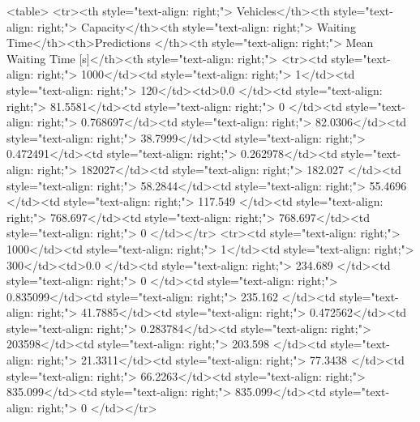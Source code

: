 <table>
<tr><th style="text-align: right;">  Vehicles</th><th style="text-align: right;">  Capacity</th><th style="text-align: right;">  Waiting Time</th><th>Predictions  </th><th style="text-align: right;">  Mean Waiting Time [s]</th><th style="text-align: right;">  %
<tr><td style="text-align: right;">      1000</td><td style="text-align: right;">         1</td><td style="text-align: right;">           120</td><td>0.0          </td><td style="text-align: right;">                81.5581</td><td style="text-align: right;">           0       </td><td style="text-align: right;">         0.768697</td><td style="text-align: right;">         82.0306</td><td style="text-align: right;">            38.7999</td><td style="text-align: right;">               0.472491</td><td style="text-align: right;">             0.262978</td><td style="text-align: right;">              182027</td><td style="text-align: right;">                      182.027 </td><td style="text-align: right;">            58.2844</td><td style="text-align: right;">                55.4696 </td><td style="text-align: right;">       117.549 </td><td style="text-align: right;">    768.697</td><td style="text-align: right;">       768.697</td><td style="text-align: right;">                  0     </td></tr>
<tr><td style="text-align: right;">      1000</td><td style="text-align: right;">         1</td><td style="text-align: right;">           300</td><td>0.0          </td><td style="text-align: right;">               234.689 </td><td style="text-align: right;">           0       </td><td style="text-align: right;">         0.835099</td><td style="text-align: right;">        235.162 </td><td style="text-align: right;">            41.7885</td><td style="text-align: right;">               0.472562</td><td style="text-align: right;">             0.283784</td><td style="text-align: right;">              203598</td><td style="text-align: right;">                      203.598 </td><td style="text-align: right;">            21.3311</td><td style="text-align: right;">                77.3438 </td><td style="text-align: right;">        66.2263</td><td style="text-align: right;">    835.099</td><td style="text-align: right;">       835.099</td><td style="text-align: right;">                  0     </td></tr>
